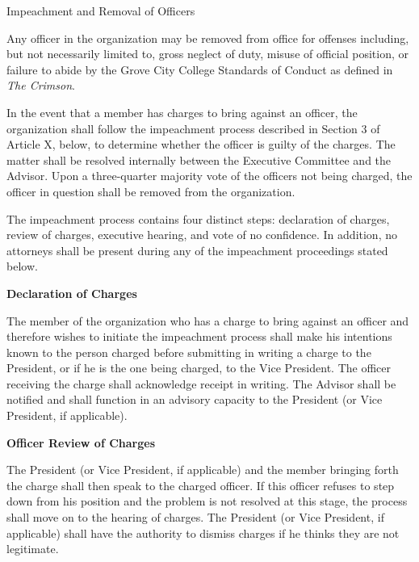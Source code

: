 {
	\begin{article}{Impeachment and Removal of Officers}
		\item Any officer in the organization may be removed from office for offenses including, but not necessarily limited to, gross neglect of duty, misuse of official position, or failure to abide by the Grove City College Standards of Conduct as defined in \textit{The Crimson}.
		\item In the event that a member has charges to bring against an officer, the organization shall follow the impeachment process described in Section 3 of Article X, below, to determine whether the officer is guilty of the charges. The matter shall be resolved internally between the Executive Committee and the Advisor. Upon a three-quarter majority vote of the officers not being charged, the officer in question shall be removed from the organization.
		\item The impeachment process contains four distinct steps: declaration of charges, review of charges, executive hearing, and vote of no confidence.  In addition, no attorneys shall be present during any of the impeachment proceedings stated below.
			
		\hypertarget{Declaration of Charges}{}
		\textbf{Declaration of Charges}
		
		\begin{adjustwidth*}{2em}{}
			The member of the organization who has a charge to bring against an officer and therefore wishes to initiate the impeachment process shall make his intentions known to the person charged before submitting in writing a charge to the President, or if he is the one being charged, to the Vice President. The officer receiving the charge shall acknowledge receipt in writing. The Advisor shall be notified and shall function in an advisory capacity to the President (or Vice President, if applicable).
		\end{adjustwidth*}
	
		\hypertarget{Officer Review of Charges}{}
		\textbf{Officer Review of Charges}
		
		\begin{adjustwidth*}{2em}{}
			The President (or Vice President, if applicable) and the member bringing forth the charge shall then speak to the charged officer. If this officer refuses to step down from his position and the problem is not resolved at this stage, the process shall move on to the hearing of charges. The President (or Vice President, if applicable) shall have the authority to dismiss charges if he thinks they are not legitimate.
		\end{adjustwidth*}
	

\end{article}}
